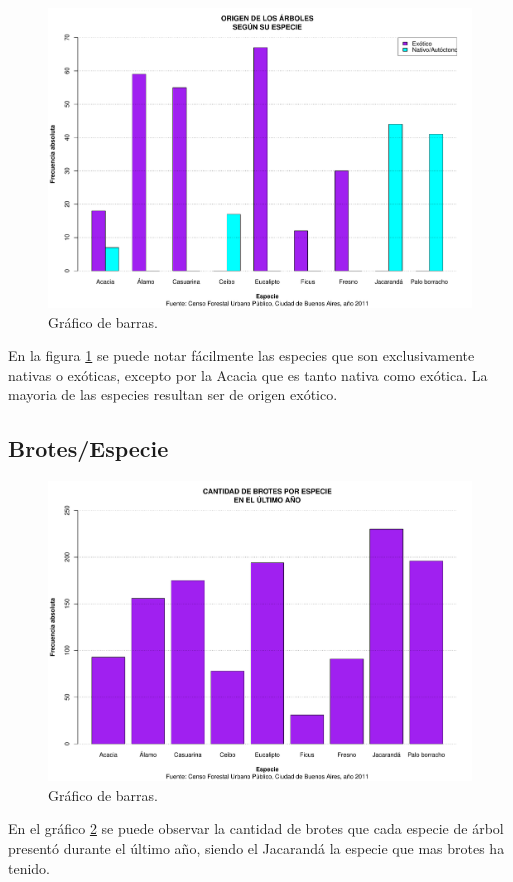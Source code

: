 \documentclass[11pt]{article}
\begin{document}
\begin{figure}[h!]
  \begin{center}
    \includegraphics[width=\linewidth]{barrasOrigenEspecie.pdf}
    \caption{Gráfico de barras.}
    \label{fig:barrasOrigenEspecie}
  \end{center}  
\end{figure}

\begin{justify}
  En la figura \ref{fig:barrasOrigenEspecie} se puede notar fácilmente
  las especies que son exclusivamente nativas o exóticas, excepto por la Acacia
  que es tanto nativa como exótica. La mayoria de las especies resultan ser
  de origen exótico.
\end{justify}


\newpage
\subsection{Brotes/Especie}

\begin{figure}[h!]
  \begin{center}
    \includegraphics[width=\linewidth]{barrasBrotesEspecie.pdf}
    \caption{Gráfico de barras.}
    \label{fig:barrasBrotesEspecie}
  \end{center}  
\end{figure}

\begin{justify}
  En el gráfico \ref{fig:barrasBrotesEspecie} se puede observar la cantidad
  de brotes que cada especie de árbol presentó durante el último año, siendo
  el Jacarandá la especie que mas brotes ha tenido.
\end{justify}
\end{document}
